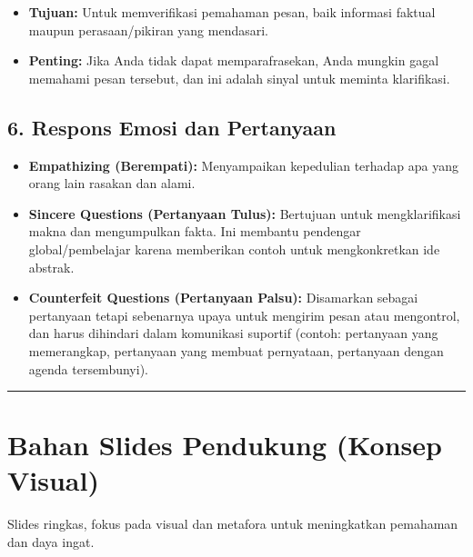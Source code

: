 \documentclass[
  letterpaper,
  DIV=11,
  numbers=noendperiod]{scrreprt}
\providecommand{\tightlist}{%
  \setlength{\itemsep}{0pt}\setlength{\parskip}{0pt}}
\begin{document}
\begin{itemize}
\tightlist
\item
  \textbf{Tujuan:} Untuk memverifikasi pemahaman pesan, baik informasi
  faktual maupun perasaan/pikiran yang mendasari.
\item
  \textbf{Penting:} Jika Anda tidak dapat memparafrasekan, Anda mungkin
  gagal memahami pesan tersebut, dan ini adalah sinyal untuk meminta
  klarifikasi.
\end{itemize}

\subsection{6. Respons Emosi dan
Pertanyaan}\label{respons-emosi-dan-pertanyaan}

\begin{itemize}
\tightlist
\item
  \textbf{Empathizing (Berempati):} Menyampaikan kepedulian terhadap apa
  yang orang lain rasakan dan alami.
\item
  \textbf{Sincere Questions (Pertanyaan Tulus):} Bertujuan untuk
  mengklarifikasi makna dan mengumpulkan fakta. Ini membantu pendengar
  global/pembelajar karena memberikan contoh untuk mengkonkretkan ide
  abstrak.
\item
  \textbf{Counterfeit Questions (Pertanyaan Palsu):} Disamarkan sebagai
  pertanyaan tetapi sebenarnya upaya untuk mengirim pesan atau
  mengontrol, dan harus dihindari dalam komunikasi suportif (contoh:
  pertanyaan yang memerangkap, pertanyaan yang membuat pernyataan,
  pertanyaan dengan agenda tersembunyi).
\end{itemize}

\begin{center}\rule{0.5\linewidth}{0.5pt}\end{center}

\section{Bahan Slides Pendukung (Konsep
Visual)}\label{bahan-slides-pendukung-konsep-visual}

Slides ringkas, fokus pada visual dan metafora untuk meningkatkan
pemahaman dan daya ingat.
\end{document}
